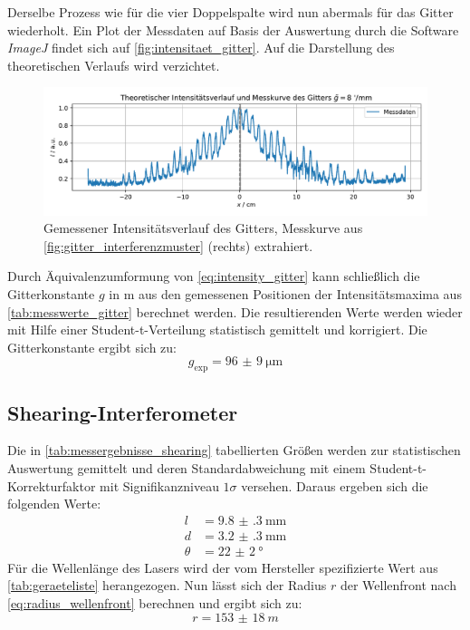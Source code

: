 \documentclass[ngerman]{scrartcl}
\begin{document}
Derselbe Prozess wie für die vier Doppelspalte wird nun abermals für das Gitter wiederholt. Ein Plot der Messdaten auf Basis der Auswertung durch die Software \textit{ImageJ} findet sich auf \autoref{fig:intensitaet_gitter}. Auf die Darstellung des theoretischen Verlaufs wird verzichtet.
%
\begin{figure}[H]
    \centering
    \begin{samepage}
        \includegraphics[width=\linewidth]{../python/plots/grating.pdf}
        \caption[Intensitätskurve Gitter]{Gemessener Intensitätsverlauf des Gitters, Messkurve aus \autoref{fig:gitter_interferenzmuster} (rechts) extrahiert.}
        \label{fig:intensitaet_gitter}
    \end{samepage}
\end{figure}
%
Durch Äquivalenzumformung von \autoref{eq:intensity_gitter} kann schließlich die Gitterkonstante $g$ in \si{m} aus den gemessenen Positionen der Intensitätsmaxima aus \autoref{tab:messwerte_gitter} berechnet werden. Die resultierenden Werte werden wieder mit Hilfe einer Student-t-Verteilung statistisch gemittelt und korrigiert. Die Gitterkonstante ergibt sich zu: 
\[g_{\text{exp}} = \SI{96(9)}{\micro\meter}\]


\subsection{Shearing-Interferometer}
\label{subsec:auswertung_shearing}

Die in \autoref{tab:messergebnisse_shearing} tabellierten Größen werden zur statistischen Auswertung gemittelt und deren Standardabweichung mit einem Student-t-Korrekturfaktor mit Signifikanzniveau $1\sigma$ versehen. Daraus ergeben sich die folgenden Werte:
\begin{align*}
    l      & = \SI{9.8(3)}{\milli\meter} \\
    d      & = \SI{3.2(3)}{\milli\meter} \\
    \theta & = \SI{22(2)}{\degree}
\end{align*}
Für die Wellenlänge des Lasers wird der vom Hersteller spezifizierte Wert aus \autoref{tab:geraeteliste} herangezogen. Nun lässt sich der Radius $r$ der Wellenfront nach \autoref{eq:radius_wellenfront} berechnen und ergibt sich zu:
\[r=\SI{153(18)}{m}\]
\end{document}
